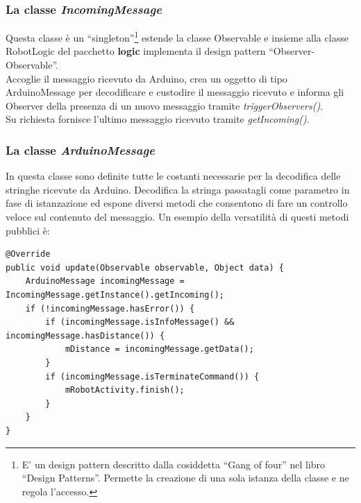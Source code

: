  \subsubsection{La classe \emph{IncomingMessage}}
 Questa classe è un ``singleton''\footnote{E' un design pattern descritto dalla 
 cosiddetta ``Gang of four'' nel libro ``Design Patterns''. 
 Permette la creazione di una sola istanza della classe e ne regola l'accesso. } 
 estende la classe Observable e insieme alla classe RobotLogic del 
 pacchetto \textbf{logic} implementa il design pattern ``Observer-Observable''. 
 \\Accoglie il messaggio ricevuto da Arduino, crea un oggetto di tipo ArduinoMessage 
 per decodificare e custodire il messaggio ricevuto e informa gli Observer della presenza 
 di un nuovo messaggio tramite \emph{triggerObservers()}.\\
 Su richiesta fornisce l'ultimo messaggio ricevuto tramite \emph{getIncoming()}.
 \subsubsection{La classe \emph{ArduinoMessage}}
 In questa classe sono definite tutte le costanti necessarie per la 
 decodifica delle stringhe ricevute da Arduino. 
 Decodifica la stringa passatagli come parametro in fase di istanzazione ed 
 espone diversi metodi che consentono di fare un controllo veloce sul contenuto del messaggio.
 Un esempio della versatilità di questi metodi pubblici è:  
 \lstset{language=Java}

\begin{lstlisting}[caption=Metodo \emph{update()} di RobotLogic del 
pacchetto \textbf{logic}]
@Override
public void update(Observable observable, Object data) {
    ArduinoMessage incomingMessage = IncomingMessage.getInstance().getIncoming();
    if (!incomingMessage.hasError()) {
        if (incomingMessage.isInfoMessage() && incomingMessage.hasDistance()) {
            mDistance = incomingMessage.getData();
        }
        if (incomingMessage.isTerminateCommand()) {
            mRobotActivity.finish();
        }
    }
}
\end{lstlisting}

